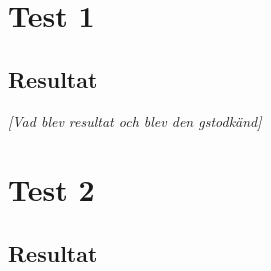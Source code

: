 \documentclass[a4paper,10pt]{article}
\begin{document}
\section{Test 1}
\subsection{Resultat}
\emph{[Vad blev resultat och blev den gstodkänd]}
\section{Test 2}
\subsection{Resultat}
\end{document}
